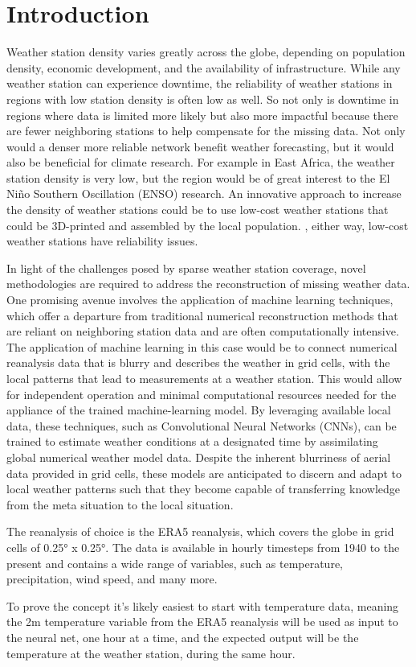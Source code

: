\section{Introduction}
\label{sec:introduction}

Weather station density varies greatly across the globe, depending on population density, economic development, and the availability of infrastructure. \cite{ortizbobea2021} While any weather station can experience downtime, the reliability of weather stations in regions with low station density is often low as well. So not only is downtime in regions where data is limited more likely but also more impactful because there are fewer neighboring stations to help compensate for the missing data. Not only would a denser more reliable network benefit weather forecasting, but it would also be beneficial for climate research. For example in East Africa, the weather station density is very low, but the region would be of great interest to the El Niño Southern Oscillation (ENSO) research. \cite{marchant2007, muita2021} An innovative approach to increase the density of weather stations could be to use low-cost weather stations that could be 3D-printed and assembled by the local population. \cite{muita2021}, either way, low-cost weather stations have reliability issues.

In light of the challenges posed by sparse weather station coverage, novel methodologies are required to address the reconstruction of missing weather data. One promising avenue involves the application of machine learning techniques, which offer a departure from traditional numerical reconstruction methods that are reliant on neighboring station data and are often computationally intensive. The application of machine learning in this case would be to connect numerical reanalysis data that is blurry and describes the weather in grid cells, with the local patterns that lead to measurements at a weather station. This would allow for independent operation and minimal computational resources needed for the appliance of the trained machine-learning model. By leveraging available local data, these techniques, such as Convolutional Neural Networks (CNNs), can be trained to estimate weather conditions at a designated time by assimilating global numerical weather model data. Despite the inherent blurriness of aerial data provided in grid cells, these models are anticipated to discern and adapt to local weather patterns such that they become capable of transferring knowledge from the meta situation to the local situation.

The reanalysis of choice is the ERA5 reanalysis, which covers the globe in grid cells of 0.25° x 0.25°. The data is available in hourly timesteps from 1940 to the present and contains a wide range of variables, such as temperature, precipitation, wind speed, and many more.

To prove the concept it's likely easiest to start with temperature data, meaning the 2m temperature variable from the ERA5 reanalysis will be used as input to the neural net, one hour at a time, and the expected output will be the temperature at the weather station, during the same hour.